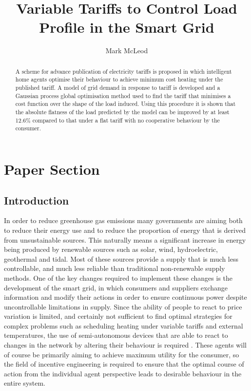 \documentclass[a4paper, 10 pt, conference]{ieeeconf}  %
\title{\LARGE \bf Variable Tariffs to Control Load Profile in the Smart Grid}
\author{Mark McLeod}
\date{}
\begin{document}
\maketitle
\thispagestyle{empty}
\pagestyle{empty}

\section{Paper Section}
\begin{abstract}
A scheme for advance publication of electricity tariffs is proposed in which intelligent home agents optimise their behaviour to achieve minimum cost heating under the published tariff. A model of grid demand in response to tariff is developed and a Gaussian process global optimisation method used to find the tariff that minimises a cost function over the shape of the load induced. Using this procedure it is shown that the absolute flatness of the load predicted by the model can be improved by at least 12.6\% compared to that under a flat tariff with no cooperative behaviour by the consumer.
\end{abstract}

\subsection{Introduction}

In order to reduce greenhouse gas emissions many governments are aiming both to reduce their energy use and to reduce the proportion of energy that is derived from unsustainable sources. This naturally means a significant increase in energy being produced by renewable sources such as solar, wind, hydroelectric, geothermal and tidal. Most of these sources provide a supply that is much less controllable, and much less reliable than traditional non-renewable supply methods. One of the key changes required to implement these changes is the development of the smart grid, in which consumers and suppliers exchange information and modify their actions in order to ensure continuous power despite uncontrollable limitations in supply. Since the ability of people to react to price variation is limited, and certainly not sufficient to find optimal strategies for complex problems such as scheduling heating under variable tariffs and external temperatures, the use of semi-autonomous devices that are able to react to changes in the network by altering their behaviour is required \cite{rogers2012delivering}. These agents will of course be primarily aiming to achieve maximum utility for the consumer, so the field of incentive engineering is required to ensure that the optimal course of action from the individual agent perspective leads to desirable behaviour in the entire system.
\end{document}
